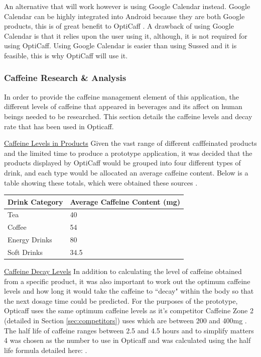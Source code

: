 An alternative that will work however is using Google Calendar instead. Google Calendar can be highly integrated into Android because they are both Google products, this is of great benefit to OptiCaff \cite{calendar}. A drawback of using Google Calendar is that it relies upon the user using it, although, it is not required for using OptiCaff. Using Google Calendar is easier than using Sussed and it is feasible, this is why OptiCaff will use it.

\subsubsection{Caffeine Research \& Analysis}
\label{sec:Caffeine}

In order to provide the caffeine management element of this application, the different levels of caffeine that appeared in beverages and its affect on human beings needed to be researched. This section details the caffeine levels and decay rate that has been used in Opticaff. 

\underline{Caffeine Levels in Products} \newline
Given the vast range of different cafffeinated products and the limited time to produce a prototype application, it was decided that the products displayed by OptiCaff would be grouped into four different types of drink, and each type would be allocated an average caffeine content. Below is a table showing these totals, which were obtained these sources \cite{Coke} \cite{TeaCoffee} \cite{EnergyDrink}.

\begin{center}
\begin{tabular}{|l|l|}
\hline
\textbf{Drink Category} & \textbf{Average Caffeine Content (mg)} \\\hline
Tea & 40 \\\hline
Coffee & 54 \\\hline
Energy Drinks & 80 \\\hline
Soft Drinks & 34.5 \\\hline
\end{tabular}
\end{center}

\underline{Caffeine Decay Levels} \newline
In addition to calculating the level of caffeine obtained from a specific product, it was also important to work out the optimum caffeine levels and how long it would take the caffeine to ``decay" within the body so that the next dosage time could be predicted. For the purposes of the prototype, Opticaff uses the same optimum caffeine levels as it's competitor Caffeine Zone 2 (detailed in Section \ref{sec:competitors}) uses which are between 200 and 400mg \cite{CaffeineZoneInfo}. The half life of caffeine ranges between 2.5 and 4.5 hours \cite{CaffeinePharmacology} \cite{CaffeinePharmacy} and to simplify matters 4 was chosen as the number to use in Opticaff and was calculated using the half life formula detailed here: \cite{HalfLife}.
 
